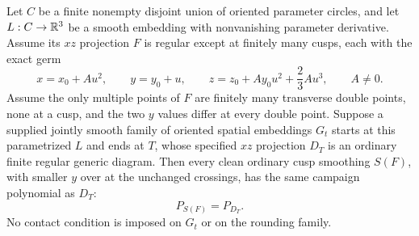 \begin{lemma}
\label{cp:finite-contact-path}
Let $C$ be a finite nonempty disjoint union of oriented parameter circles,
and let $L:C\to\mathbb R^3$ be a smooth embedding with nonvanishing parameter
derivative. Assume its $xz$ projection $F$ is regular except at finitely
many cusps, each with the exact germ
\begin{equation}\label{cp:exact-cusp}
 x=x_0+Au^2,\qquad y=y_0+u,\qquad
 z=z_0+Ay_0u^2+\frac23Au^3,\qquad A\ne0.
\end{equation}
Assume the only multiple points of $F$ are finitely many transverse
double points, none at a cusp, and the two $y$ values differ at every
double point. Suppose a supplied jointly
smooth family of oriented spatial embeddings $G_t$ starts at this
parametrized $L$ and ends at $T$, whose specified $xz$ projection $D_T$
is an ordinary finite regular generic diagram. Then every clean ordinary
cusp smoothing $S(F)$, with smaller $y$ over at the unchanged crossings,
has the same campaign polynomial as $D_T$:
\begin{equation}\label{cp:endpoint-polynomial}
                    P_{S(F)}=P_{D_T}.
\end{equation}
No contact condition is imposed on $G_t$ or on the rounding family.
\end{lemma}

